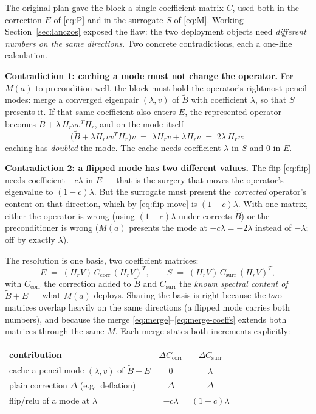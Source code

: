 \documentclass[11pt]{article}
\newcommand{\Bt}{\widetilde{B}}
\newcommand{\Hr}{H_r}
\newcommand{\Ccorr}{C_{\mathrm{corr}}}
\newcommand{\Csurr}{C_{\mathrm{surr}}}
\begin{document}
The original plan gave the block a single coefficient matrix $C$, used
both in the correction $E$ of \eqref{eq:P} and in the surrogate $S$ of
\eqref{eq:M}. Working Section~\ref{sec:lanczos} exposed the flaw: the two
deployment objects need \emph{different numbers on the same directions}.
Two concrete contradictions, each a one-line calculation.

\medskip
\noindent
\textbf{Contradiction 1: caching a mode must not change the operator.}
For $M(a)$ to precondition well, the block must hold the operator's
rightmost pencil modes: merge a converged eigenpair $(\lambda, v)$ of
$\Bt$ with coefficient $\lambda$, so that $S$ presents it. If that same
coefficient also enters $E$, the represented operator becomes
$\Bt + \lambda\, \Hr v v^T \Hr$, and on the mode itself
\begin{equation}
  \bigl(\Bt + \lambda \Hr v v^T \Hr\bigr) v
  \;=\; \lambda \Hr v + \lambda \Hr v
  \;=\; 2\lambda\, \Hr v :
  \label{eq:double-count}
\end{equation}
caching has \emph{doubled} the mode. The cache needs coefficient
$\lambda$ in $S$ and $0$ in $E$.

\medskip
\noindent
\textbf{Contradiction 2: a flipped mode has two different values.} The
flip \eqref{eq:flip} needs coefficient $-c\lambda$ in $E$ --- that is the
surgery that moves the operator's eigenvalue to $(1-c)\lambda$. But the
surrogate must present the \emph{corrected} operator's content on that
direction, which by \eqref{eq:flip-move} is $(1-c)\lambda$. With one
matrix, either the operator is wrong (using $(1-c)\lambda$ under-corrects
$\Bt$) or the preconditioner is wrong ($M(a)$ presents the mode at
$-c\lambda = -2\lambda$ instead of $-\lambda$; off by exactly
$\lambda$).

\medskip
\noindent
The resolution is one basis, two coefficient matrices:
\begin{equation}
  E \;=\; (\Hr V)\, \Ccorr\, (\Hr V)^T,
  \qquad
  S \;=\; (\Hr V)\, \Csurr\, (\Hr V)^T,
\end{equation}
with $\Ccorr$ the correction added to $\Bt$ and $\Csurr$ the \emph{known
spectral content of $\Bt + E$} --- what $M(a)$ deploys. Sharing the basis
is right because the two matrices overlap heavily on the same directions
(a flipped mode carries both numbers), and because the merge
\eqref{eq:merge}--\eqref{eq:merge-coeffs} extends both matrices through
the same $M$. Each merge states both increments explicitly:

\begin{center}
\begin{tabular}{lcc}
\toprule
contribution & $\Delta \Ccorr$ & $\Delta \Csurr$ \\
\midrule
cache a pencil mode $(\lambda, v)$ of $\Bt + E$ & $0$ & $\lambda$ \\
plain correction $\Delta$ (e.g.\ deflation) & $\Delta$ & $\Delta$ \\
flip/relu of a mode at $\lambda$ & $-c\lambda$ & $(1-c)\lambda$ \\
\bottomrule
\end{tabular}
\end{center}
\end{document}
